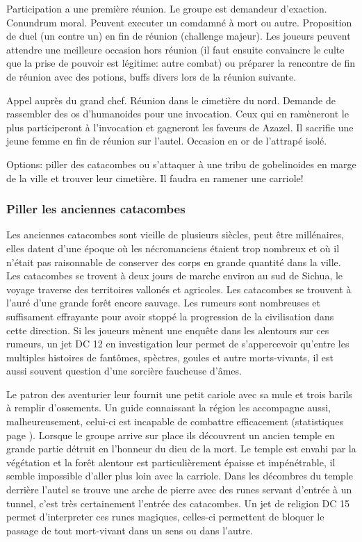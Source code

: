 Participation a une première réunion.
Le groupe est demandeur d'exaction. Conundrum moral. Peuvent executer un comdamné à mort ou autre.
Proposition de duel (un contre un) en fin de réunion (challenge majeur). Les joueurs peuvent attendre une meilleure
occasion hors réunion (il faut ensuite convaincre le culte que la prise de 
pouvoir est légitime: autre combat) ou préparer la rencontre de fin de réunion avec des potions, buffs divers lors de la réunion suivante.


Appel auprès du grand chef. Réunion dans le cimetière du nord. Demande de rassembler des os d'humanoides 
pour une invocation. Ceux qui en ramèneront le plus participeront à l'invocation et gagneront les faveurs de Azazel.
Il sacrifie une jeune femme en fin de réunion sur l'autel.  Occasion en or de l'attrapé isolé.

Options: piller des catacombes ou s'attaquer à une tribu de gobelinoides en marge de la ville et trouver leur cimetière. Il faudra en ramener une carriole!

\subsubsection*{Piller les anciennes catacombes}

Les anciennes catacombes sont vieille de plusieurs siècles, peut être millénaires, elles datent d'une époque où 
les nécromanciens étaient trop nombreux et où il n'était pas raisonnable de conserver des corps 
en grande quantité dans la ville. Les catacombes se trovent à deux jours de marche environ au sud 
de Sichua, le voyage traverse des territoires vallonés et agricoles. Les catacombes se trouvent à
l'auré d'une grande forêt encore sauvage. Les rumeurs sont nombreuses et suffisament effrayante pour
avoir stoppé la progression de la civilisation dans cette direction. Si les joueurs mènent une enquête
dans les alentours sur ces rumeurs, un jet DC 12 en investigation leur permet de s'appercevoir qu'entre
les multiples histoires de fantômes, spèctres, goules et autre morts-vivants, il est aussi souvent 
question d'une sorcière faucheuse d'âmes.

Le patron des aventurier leur fournit une petit cariole avec sa mule et trois barils à remplir 
d'ossements. Un guide connaissant la région les accompagne aussi, malheureusement, celui-ci est
incapable de combattre efficacement (statistiques page \pageref{Eclaireur}). Lorsque le groupe
arrive sur place ils découvrent un ancien temple en grande partie détruit en l'honneur du dieu 
de la mort. Le temple est envahi par la végétation et la forêt alentour est particulièrement
épaisse et impénétrable, il semble impossible d'aller plus loin avec la carriole. Dans les 
décombres du temple derrière l'autel se trouve une arche de pierre avec des runes servant 
d'entrée à un tunnel, c'est très certainement l'entrée des catacombes. Un jet de religion
DC 15 permet d'interpreter ces runes magiques, celles-ci permettent de bloquer le passage
de tout mort-vivant dans un sens ou dans l'autre.


